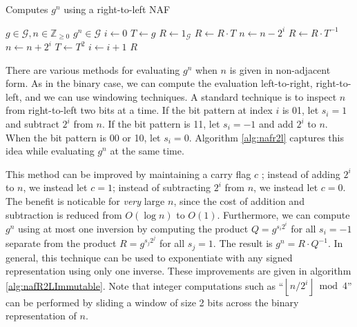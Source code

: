 \documentclass{ucalgthes1}
\theoremstyle{plain}
\theoremstyle{definition}
\newcommand{\ZZgez}{\mathbb{Z}_{\ge 0}}
\newcommand{\floor}[1]{\left\lfloor #1 \right\rfloor}
\begin{document}
\begin{algorithm}[h]
\caption{Computes $g^n$ using a right-to-left NAF}\label{alg:nafr2l}
\begin{algorithmic}[1]
\REQUIRE $g \in \mathcal G, n \in \ZZgez$
\ENSURE $g^n \in \mathcal G$
\STATE $i \gets 0$
\STATE $T \gets g$ 
\STATE $R \gets 1_{\mathcal G}$
	\IF {$\floor{n/2^i} \equiv 1 \pmod 4$}
		\STATE $R \gets R \cdot T$
		\STATE $n \gets n-2^i$
	\ELSIF {$\floor{n/2^i} \equiv 3 \pmod 4$}
		\STATE $R \gets R \cdot T^{-1}$
		\STATE $n \gets n+2^i$
	\ENDIF
	\STATE $T \gets T^2$
	\STATE $i \gets i + 1$
\ENDWHILE
\RETURN $R$
\end{algorithmic}
\end{algorithm}

There are various methods for evaluating $g^n$ when $n$ is given in non-adjacent form.  As in the binary case, we can compute the evaluation left-to-right, right-to-left, and we can use windowing techniques.  A standard technique is to inspect $n$ from right-to-left two bits at a time.  If the bit pattern at index $i$ is 01, let $s_i = 1$ and subtract $2^i$ from $n$.  If the bit pattern is 11, let $s_i = -1$ and add $2^i$ to $n$.  When the bit pattern is 00 or 10, let $s_i =0$.  Algorithm \ref{alg:nafr2l} captures this idea while evaluating $g^n$ at the same time.

This method can be improved by maintaining a carry flag $c$ \cite[p.4]{Joye2000}; instead of adding $2^i$ to $n$, we instead let $c = 1$; instead of subtracting $2^i$ from $n$, we instead let $c = 0$.  The benefit is noticable for \emph{very} large $n$, since the cost of addition and subtraction is reduced from $O(\log n)$ to $O(1)$.  Furthermore, we can compute $g^n$ using at most one inversion by computing the product $Q = g^{s_i2^i}$ for all $s_i = -1$ separate from the product $R = g^{s_j2^j}$ for all $s_j = 1$.  The result is $g^n = R \cdot Q^{-1}$.  In general, this technique can be used to exponentiate with any signed representation using only one inverse.  These improvements are given in algorithm \ref{alg:nafR2LImmutable}.  Note that integer computations such as ``$\floor{n/2^i} \bmod 4$'' can be performed by sliding a window of size 2 bits across the binary representation of $n$.
\end{document}
